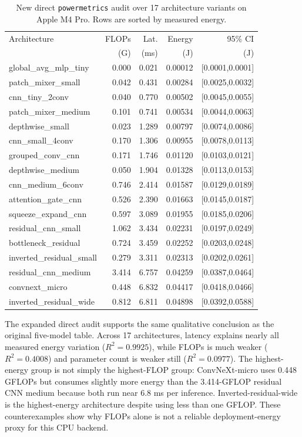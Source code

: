 \documentclass[conference]{IEEEtran}
\begin{document}
\begin{table}[t]
\centering
\caption{New direct \texttt{powermetrics} audit over 17 architecture variants on Apple M4 Pro. Rows are sorted by measured energy.}
\label{tab:m4arch17}
\small
\begin{tabular}{lrrrr}
\toprule
Architecture & FLOPs & Lat. & Energy & 95\% CI \\
 & (G) & (ms) & (J) & (J) \\
\midrule
global\_avg\_mlp\_tiny & 0.000 & 0.021 & 0.00012 & [0.0001,0.0001] \\
patch\_mixer\_small & 0.042 & 0.431 & 0.00284 & [0.0025,0.0032] \\
cnn\_tiny\_2conv & 0.040 & 0.770 & 0.00502 & [0.0045,0.0055] \\
patch\_mixer\_medium & 0.101 & 0.741 & 0.00534 & [0.0044,0.0063] \\
depthwise\_small & 0.023 & 1.289 & 0.00797 & [0.0074,0.0086] \\
cnn\_small\_4conv & 0.170 & 1.306 & 0.00955 & [0.0078,0.0113] \\
grouped\_conv\_cnn & 0.171 & 1.746 & 0.01120 & [0.0103,0.0121] \\
depthwise\_medium & 0.050 & 1.904 & 0.01328 & [0.0113,0.0153] \\
cnn\_medium\_6conv & 0.746 & 2.414 & 0.01587 & [0.0129,0.0189] \\
attention\_gate\_cnn & 0.526 & 2.390 & 0.01663 & [0.0145,0.0187] \\
squeeze\_expand\_cnn & 0.597 & 3.089 & 0.01955 & [0.0185,0.0206] \\
residual\_cnn\_small & 1.062 & 3.434 & 0.02231 & [0.0197,0.0249] \\
bottleneck\_residual & 0.724 & 3.459 & 0.02252 & [0.0203,0.0248] \\
inverted\_residual\_small & 0.279 & 3.311 & 0.02313 & [0.0202,0.0261] \\
residual\_cnn\_medium & 3.414 & 6.757 & 0.04259 & [0.0387,0.0464] \\
convnext\_micro & 0.448 & 6.832 & 0.04417 & [0.0418,0.0466] \\
inverted\_residual\_wide & 0.812 & 6.811 & 0.04898 & [0.0392,0.0588] \\
\bottomrule
\end{tabular}
\end{table}

The expanded direct audit supports the same qualitative conclusion as the
original five-model table. Across 17 architectures, latency explains nearly
all measured energy variation ($R^2=0.9925$), while FLOPs is much weaker
($R^2=0.4008$) and parameter count is weaker still ($R^2=0.0977$). The
highest-energy group is not simply the highest-FLOP group: ConvNeXt-micro uses
0.448 GFLOPs but consumes slightly more energy than the 3.414-GFLOP residual
CNN medium because both run near 6.8 ms per inference. Inverted-residual-wide
is the highest-energy architecture despite using less than one GFLOP. These
counterexamples show why FLOPs alone is not a reliable deployment-energy proxy
for this CPU backend.
\end{document}
